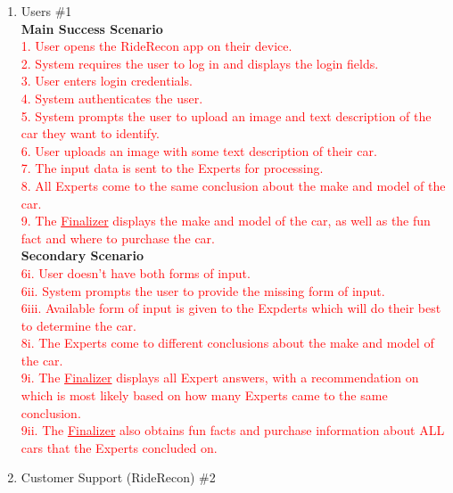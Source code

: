 \documentclass[]{article}
\begin{document}
\begin{enumerate}[label={\bf BE\arabic*.}]
		\begin{enumerate}[label=\textbf{VP\arabic*.}]
			\item Users \#1 \\
				\textbf{Main Success Scenario} \\
				\textcolor{red}{1. User opens the RideRecon app on their device.} \\
				\textcolor{red}{2. System requires the user to log in and displays the login fields.} \\
				\textcolor{red}{3. User enters login credentials.} \\
				\textcolor{red}{4. System authenticates the user.} \\
				\textcolor{red}{5. System prompts the user to upload an image and text description of the car they want to identify.} \\
				\textcolor{red}{6. User uploads an image with some text description of their car.} \\
				\textcolor{red}{7. The input data is sent to the Experts for processing.} \\
				\textcolor{red}{8. All Experts come to the same conclusion about the make and model of the car.} \\
				\textcolor{red}{9. The \underline{Finalizer} displays the make and model of the car, as well as the fun fact and where to purchase the car.} \\
				\textbf{Secondary Scenario} \\
				\textcolor{red}{6i. User doesn't have both forms of input.} \\
				\textcolor{red}{6ii. System prompts the user to provide the missing form of input.} \\
				\textcolor{red}{6iii. Available form of input is given to the Expderts which will do their best to determine the car.} \\
				\textcolor{red}{8i. The Experts come to different conclusions about the make and model of the car.} \\
				\textcolor{red}{9i. The \underline{Finalizer} displays all Expert answers, with a recommendation on which is most likely based on how many Experts came to the same conclusion.} \\
				\textcolor{red}{9ii. The \underline{Finalizer} also obtains fun facts and purchase information about ALL cars that the Experts concluded on.} \\
			\item Customer Support (RideRecon) \#2 \\

\end{enumerate}
\end{enumerate}
\end{document}
